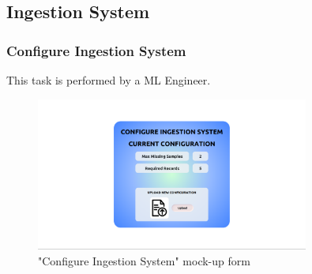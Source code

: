 \subsection{Ingestion System}

\subsubsection{Configure Ingestion System}

This task is performed by a ML Engineer.

\begin{figure}[H]
\centering
\includegraphics[width=0.8\textwidth]{figures/ui_configure_ingestion.png}
\caption{"Configure Ingestion System" mock-up form}
\end{figure}

